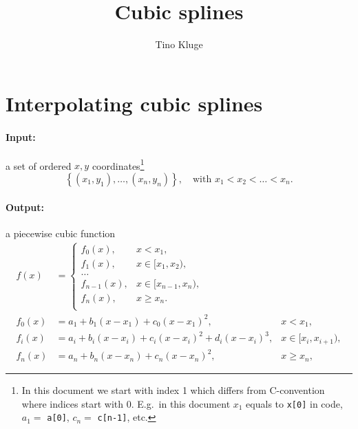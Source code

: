 \documentclass[11pt]{article}
\title{Cubic splines}
\author{Tino Kluge}
\date{\moddate{\jobname.tex}}
\providecommand{\set}[1]{\left\{ #1 \right\}}
\providecommand{\set}[1]{\left\{ #1 \right\}}
\newcommand{\code}{\texttt}
\theoremstyle{break}            %
\begin{document}
\maketitle

\section{Interpolating cubic splines}
\paragraph{Input:} a set of ordered $x, y$ coordinates\footnote{In this
    document we start with index 1 which differs from C-convention
    where indices start with 0. E.g.\ in this document $x_1$ equals to
\code{x[0]} in code, $a_1=$ \code{a[0]}, $c_n=$ \code{c[n-1]}, etc.}
\begin{equation*}
\set{(x_1,y_1),\dots,(x_n,y_n)},\quad \text{with } x_1 < x_2 < \dots < x_n.
\end{equation*}
\paragraph{Output:} a piecewise cubic function
\begin{equation}
\begin{aligned}
    f(x) & = \begin{cases}
            f_0(x), & x<x_1,\\
            f_1(x), & x\in[x_1,x_2),\\
            \dots  \\
            f_{n-1}(x), & x\in[x_{n-1},x_n), \\
            f_{n}(x), & x\geq x_n. \\
            \end{cases} \\
            f_0(x)  & = a_1 + b_1 (x-x_1) + c_0 (x-x_1)^2, & x<x_1,\\
            f_i(x)  & = a_i + b_i (x-x_i) + c_i (x-x_i)^2 + d_i (x-x_i)^3, &
            x\in[x_i, x_{i+1}),\\
                f_n(x)  & = a_n + b_n (x-x_n) + c_n (x-x_n)^2, & x\geq x_n,
\end{aligned}
\end{equation}
\end{document}
